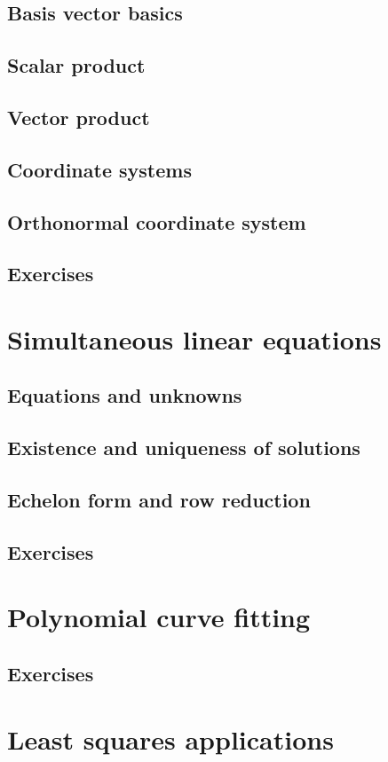 {\subsection{Basis vector basics}
\subsection{Scalar product}
\subsection{Vector product}
\subsection{Coordinate systems}
\subsection{Orthonormal coordinate system}
\subsection{Exercises}
\section{Simultaneous linear equations}
\subsection{Equations and unknowns}
\subsection{Existence and uniqueness of solutions}
\subsection{Echelon form and row reduction}
\subsection{Exercises}
\section{Polynomial curve fitting}
\subsection{Exercises}
\section{Least squares applications}
}
